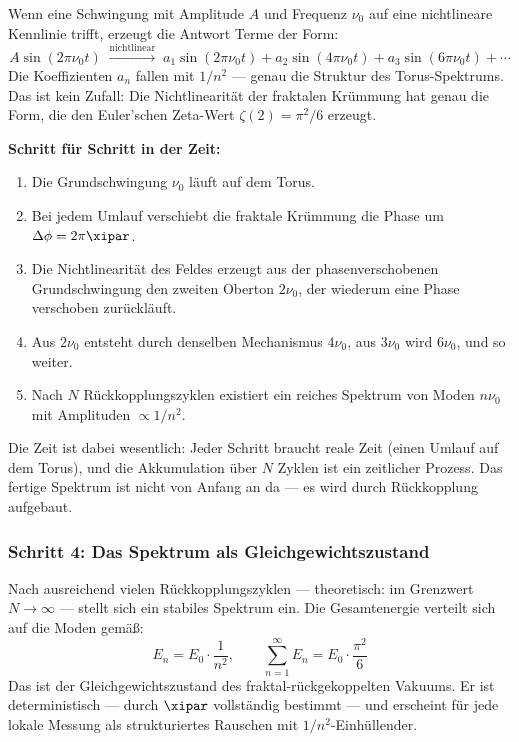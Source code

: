 Wenn eine Schwingung mit Amplitude $A$ und Frequenz $\nu_0$ auf eine
nichtlineare Kennlinie trifft, erzeugt die Antwort Terme der Form:
\begin{equation}
    A \sin(2\pi \nu_0 t) \;\xrightarrow{\text{nichtlinear}}\;
    a_1 \sin(2\pi \nu_0 t) + a_2 \sin(4\pi \nu_0 t) + a_3 \sin(6\pi \nu_0 t) + \cdots
\end{equation}
Die Koeffizienten $a_n$ fallen mit $1/n^2$ — genau die Struktur des
Torus-Spektrums. Das ist kein Zufall: Die Nichtlinearität der fraktalen Krümmung
hat genau die Form, die den Euler'schen Zeta-Wert $\zeta(2) = \pi^2/6$ erzeugt.

\begin{keypoint}
\textbf{Schritt für Schritt in der Zeit:}
\begin{enumerate}
    \item Die Grundschwingung $\nu_0$ läuft auf dem Torus.
    \item Bei jedem Umlauf verschiebt die fraktale Krümmung die Phase um $\Delta\phi = 2\pi\xipar$.
    \item Die Nichtlinearität des Feldes erzeugt aus der phasenverschobenen
    Grundschwingung den zweiten Oberton $2\nu_0$, der wiederum eine Phase
    verschoben zurückläuft.
    \item Aus $2\nu_0$ entsteht durch denselben Mechanismus $4\nu_0$, aus $3\nu_0$
    wird $6\nu_0$, und so weiter.
    \item Nach $N$ Rückkopplungszyklen existiert ein reiches Spektrum von Moden
    $n\nu_0$ mit Amplituden $\propto 1/n^2$.
\end{enumerate}
Die Zeit ist dabei wesentlich: Jeder Schritt braucht reale Zeit (einen Umlauf
auf dem Torus), und die Akkumulation über $N$ Zyklen ist ein zeitlicher Prozess.
Das fertige Spektrum ist nicht von Anfang an da — es wird durch Rückkopplung
aufgebaut.
\end{keypoint}

\subsubsection*{Schritt 4: Das Spektrum als Gleichgewichtszustand}

Nach ausreichend vielen Rückkopplungszyklen — theoretisch: im Grenzwert
$N \to \infty$ — stellt sich ein stabiles Spektrum ein. Die Gesamtenergie
verteilt sich auf die Moden gemäß:
\begin{equation}
    E_n = E_0 \cdot \frac{1}{n^2}, \qquad \sum_{n=1}^{\infty} E_n = E_0 \cdot \frac{\pi^2}{6}
\end{equation}
Das ist der Gleichgewichtszustand des fraktal-rückgekoppelten Vakuums. Er ist
deterministisch — durch $\xipar$ vollständig bestimmt — und erscheint für jede
lokale Messung als strukturiertes Rauschen mit $1/n^2$-Einhüllender.

